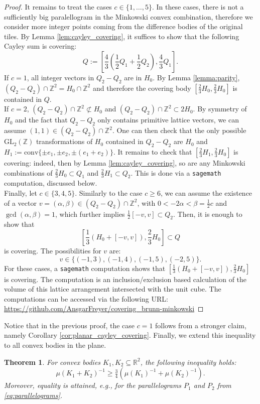 \documentclass[11pt, a4paper]{amsart}
\newcommand{\RR}{\mathbb{R}}
\newcommand{\ZZ}{\mathbb{Z}}
\newcommand{\conv}{\mathrm{conv}}
\newcommand{\GL}{\mathrm{GL}}
\numberwithin{equation}{section}
\theoremstyle{plain}
\newtheorem{theorem}{Theorem}[section]
\begin{document}
\begin{proof}
It remains to treat the cases $c\in \{1,\dots,5\}$. In these cases, there is not a sufficiently big paralellogram in the Minkowski convex combination, therefore we consider more integer points coming from the difference bodies of the original tiles. 
By Lemma \ref{lem:cayley_covering}, it suffices to show that the following Cayley sum is covering:
\[
Q:=\left[\frac{4}{3}\left( \frac{1}{2}Q_1+\frac{1}{2}Q_2\right), \frac{4}{3}Q_1\right].
\]
If $c=1$, all integer vectors in $Q_2-Q_2$ are in $H_0$. By Lemma \ref{lemma:parity}, $(Q_2-Q_2)\cap \ZZ^2= H_0\cap \ZZ^2$ and therefore the covering body $[\frac{2}{3}H_0, \frac{2}{3}H_0]$ is contained in $Q$.\\
If $c=2$, $(Q_2-Q_2)\cap \ZZ^2\not\subset H_0$ and $(Q_2-Q_2)\cap \ZZ^2\subset 2H_0$. By symmetry of $H_0$ and the fact that $Q_2-Q_2$ only contains primitive lattice vectors, we can assume $(1,1)\in (Q_2-Q_2)\cap \ZZ^2$. One can then check that the only possible $\GL_2(\ZZ)$ transformations of $H_0$ contained in $Q_2-Q_2$ are $H_0$ and $H_1:=\conv \{ \pm e_1, \pm e_2, \pm(e_1+e_2) \}$. It remains to check that $[\frac{2}{3}H_1, \frac{2}{3}H_0]$ is covering: indeed, then by Lemma \ref{lem:cayley_covering}, so are any Minkowski combinations of $\frac{2}{3}H_0\subset Q_1$ and $\frac{2}{3}H_1\subset Q_2$. This is done via a \texttt{sagemath} computation, discussed below.\\
Finally, let $c\in \{3,4, 5\}$. Similarly to the case $c\geq 6$, we can assume the existence of a vector $v=(\alpha, \beta)\in (Q_2-Q_2)\cap \ZZ^2$, with $0< -2\alpha <  \beta= \tfrac 12 c$ and $\gcd(\alpha, \beta)=1$, which further implies $\frac{1}{2}[-v,v]\subset Q_2$. Then, it is enough to show that
\[
\left[ \frac{1}{3}\left(H_0+[-v,v]\right), \frac{2}{3}H_0 \right]\subset Q
\]
is covering. The possibilities for $v$ are:
\[v\in \{ (-1,3), (-1,4), (-1,5), (-2,5)\}.\]
For these cases, a \texttt{sagemath} \cite{sagemath} computation shows that $\left[\frac{1}{3}\left(H_0+[-v,v]\right), \frac{2}{3}H_0 \right]$ is covering. The computation is an inclusion/exclusion based calculation of the volume of this lattice arrangement intersected with the unit cube. The computations can be accessed via the following URL: \url{https://github.com/AnsgarFreyer/covering_brunn-minkowski}
\end{proof}
\noindent Notice that in the previous proof, the case $c=1$ follows from a stronger claim, namely Corollary \ref{cor:planar_cayley_covering}.
Finally, we extend this inequality to all convex bodies in the plane.
\begin{theorem}
\label{thm:planar_mu_bm_text}
For convex bodies $K_1,K_2\subseteq \RR^2$, the following inequality holds:
\[
\mu(K_1+K_2)^{-1}\geq \tfrac{3}{4}\left( \mu(K_1)^{-1}+\mu(K_2)^{-1}\right).
\]
Moreover, equality is attained, e.g., for the parallelograms $P_1$ and $P_2$ from \eqref{eq:parallelograms}.
\end{theorem}
\end{document}
